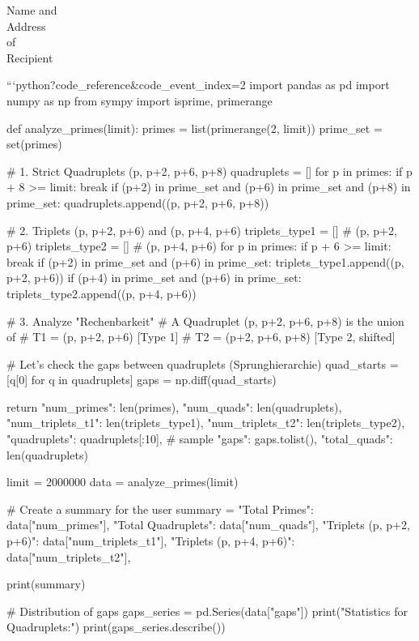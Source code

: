 \documentclass[fontsize=12pt, paper=a4]{scrlttr2}
\begin{document}
\begin{letter}{Name and \\ Address \\ of \\ Recipient}

\opening{}  %

```python?code_reference&code_event_index=2
import pandas as pd
import numpy as np
from sympy import isprime, primerange

def analyze_primes(limit):
    primes = list(primerange(2, limit))
    prime_set = set(primes)
    
    # 1. Strict Quadruplets (p, p+2, p+6, p+8)
    quadruplets = []
    for p in primes:
        if p + 8 >= limit: break
        if (p+2) in prime_set and (p+6) in prime_set and (p+8) in prime_set:
            quadruplets.append((p, p+2, p+6, p+8))
            
    # 2. Triplets (p, p+2, p+6) and (p, p+4, p+6)
    triplets_type1 = [] # (p, p+2, p+6)
    triplets_type2 = [] # (p, p+4, p+6)
    for p in primes:
        if p + 6 >= limit: break
        if (p+2) in prime_set and (p+6) in prime_set:
            triplets_type1.append((p, p+2, p+6))
        if (p+4) in prime_set and (p+6) in prime_set:
            triplets_type2.append((p, p+4, p+6))
            
    # 3. Analyze "Rechenbarkeit"
    # A Quadruplet (p, p+2, p+6, p+8) is the union of 
    # T1 = (p, p+2, p+6) [Type 1]
    # T2 = (p+2, p+6, p+8) [Type 2, shifted]
    
    # Let's check the gaps between quadruplets (Sprunghierarchie)
    quad_starts = [q[0] for q in quadruplets]
    gaps = np.diff(quad_starts)
    
    return {
        "num_primes": len(primes),
        "num_quads": len(quadruplets),
        "num_triplets_t1": len(triplets_type1),
        "num_triplets_t2": len(triplets_type2),
        "quadruplets": quadruplets[:10], # sample
        "gaps": gaps.tolist(),
        "total_quads": len(quadruplets)
    }

limit = 2000000
data = analyze_primes(limit)

# Create a summary for the user
summary = {
    "Total Primes": data["num_primes"],
    "Total Quadruplets": data["num_quads"],
    "Triplets (p, p+2, p+6)": data["num_triplets_t1"],
    "Triplets (p, p+4, p+6)": data["num_triplets_t2"],
}

print(summary)

# Distribution of gaps
gaps_series = pd.Series(data["gaps"])
print("\nGap Statistics for Quadruplets:")
print(gaps_series.describe())


\end{letter}
\end{document}
